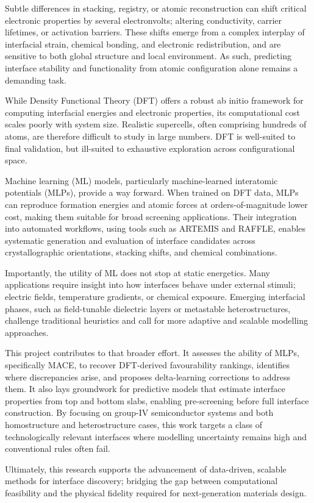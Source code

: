 Subtle differences in stacking, registry, or atomic reconstruction can shift critical electronic properties by several
electronvolts; altering conductivity, carrier lifetimes, or activation barriers. These shifts emerge from a complex
interplay of interfacial strain, chemical bonding, and electronic redistribution, and are sensitive to both global
structure and local environment. As such, predicting interface stability and functionality from atomic configuration
alone remains a demanding task.

While Density Functional Theory (DFT) offers a robust ab initio framework for computing interfacial energies and
electronic properties, its computational cost scales poorly with system size. Realistic supercells, often comprising
hundreds of atoms, are therefore difficult to study in large numbers. DFT is well-suited to final validation, but
ill-suited to exhaustive exploration across configurational space.

Machine learning (ML) models, particularly machine-learned interatomic potentials (MLPs), provide a way forward. When
trained on DFT data, MLPs can reproduce formation energies and atomic forces at orders-of-magnitude lower cost, making
them suitable for broad screening applications. Their integration into automated workflows, using tools such as ARTEMIS
and RAFFLE, enables systematic generation and evaluation of interface candidates across crystallographic orientations,
stacking shifts, and chemical combinations.

Importantly, the utility of ML does not stop at static energetics. Many applications require insight into how
interfaces behave under external stimuli; electric fields, temperature gradients, or chemical exposure. Emerging
interfacial phases, such as field-tunable dielectric layers or metastable heterostructures, challenge traditional
heuristics and call for more adaptive and scalable modelling approaches.

This project contributes to that broader effort. It assesses the ability of MLPs, specifically MACE, to recover
DFT-derived favourability rankings, identifies where discrepancies arise, and proposes delta-learning corrections to
address them. It also lays groundwork for predictive models that estimate interface properties from top and bottom
slabs, enabling pre-screening before full interface construction. By focusing on group-IV semiconductor systems and
both homostructure and heterostructure cases, this work targets a class of technologically relevant interfaces where
modelling uncertainty remains high and conventional rules often fail.

Ultimately, this research supports the advancement of data-driven, scalable methods for interface discovery; bridging
the gap between computational feasibility and the physical fidelity required for next-generation materials design.
